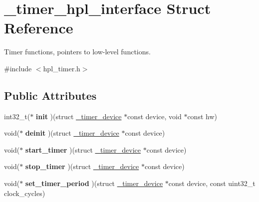 \hypertarget{struct__timer__hpl__interface}{}\section{\+\_\+timer\+\_\+hpl\+\_\+interface Struct Reference}
\label{struct__timer__hpl__interface}


Timer functions, pointers to low-\/level functions.  




{\ttfamily \#include $<$hpl\+\_\+timer.\+h$>$}

\subsection*{Public Attributes}
\begin{DoxyCompactItemize}
\item 
\mbox{\label{struct__timer__hpl__interface_ae2eceeb08048819f7906b491e6b65ef7}} 
int32\+\_\+t($\ast$ {\bfseries init} )(struct \hyperlink{struct__timer__device}{\+\_\+timer\+\_\+device} $\ast$const device, void $\ast$const hw)
\item 
\mbox{\label{struct__timer__hpl__interface_a88f7b883e6d4bd4c64f0c2355ded9d42}} 
void($\ast$ {\bfseries deinit} )(struct \hyperlink{struct__timer__device}{\+\_\+timer\+\_\+device} $\ast$const device)
\item 
\mbox{\label{struct__timer__hpl__interface_a8de36d780977766bf952b33b45298046}} 
void($\ast$ {\bfseries start\+\_\+timer} )(struct \hyperlink{struct__timer__device}{\+\_\+timer\+\_\+device} $\ast$const device)
\item 
\mbox{\label{struct__timer__hpl__interface_a03b98e2a92816433bd1139c187671c17}} 
void($\ast$ {\bfseries stop\+\_\+timer} )(struct \hyperlink{struct__timer__device}{\+\_\+timer\+\_\+device} $\ast$const device)
\item 
\mbox{\label{struct__timer__hpl__interface_a69a53d0cab1090dbd1cfe9e83ffebfc3}} 
void($\ast$ {\bfseries set\+\_\+timer\+\_\+period} )(struct \hyperlink{struct__timer__device}{\+\_\+timer\+\_\+device} $\ast$const device, const uint32\+\_\+t clock\+\_\+cycles)

\end{DoxyCompactItemize}
